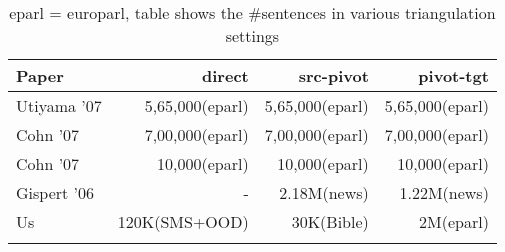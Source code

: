 \begin{table*}\centering
\small
\begin{tabular}{lrrr} \toprule

Paper & direct & src-pivot & pivot-tgt \\
\toprule

Utiyama '07  & 5,65,000(eparl) & 5,65,000(eparl) & 5,65,000(eparl)\\
Cohn '07 &  7,00,000(eparl) & 7,00,000(eparl) & 7,00,000(eparl) \\ 
Cohn '07 & 10,000(eparl) & 10,000(eparl) & 10,000(eparl) \\
Gispert '06 &  - & 2.18M(news) & 1.22M(news)\\
Us & 120K(SMS+OOD) & 30K(Bible) & 2M(eparl) \\
\bottomrule

\label{table:datasettings}
\end{tabular}
\caption{eparl = europarl, table shows the \#sentences in various triangulation settings}
\end{table*}

